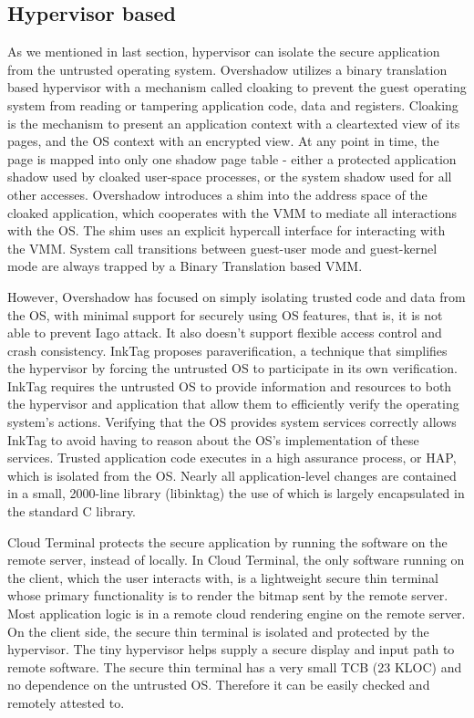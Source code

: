 \subsection{Hypervisor based}

As we mentioned in last section, hypervisor can isolate the secure application
from the untrusted operating system. Overshadow \cite{Overshadow} utilizes a
binary translation based hypervisor with a mechanism called cloaking to prevent
the guest operating system from reading or tampering application code, data and
registers.  Cloaking is the mechanism to present an application context with a
cleartexted view of its pages, and the OS context with an encrypted view. At
any point in time, the page is mapped into only one shadow page table - either
a protected application shadow used by cloaked user-space processes, or the
system shadow used for all other accesses. Overshadow introduces a shim into
the address space of the cloaked application, which cooperates with the VMM to
mediate all interactions with the OS. The shim uses an explicit hypercall
interface for interacting with the VMM. System call transitions between
guest-user mode and guest-kernel mode are always trapped by a Binary
Translation based VMM.

However, Overshadow has focused on simply isolating trusted code and data from
the OS, with minimal support for securely using OS features, that is, it is not
able to prevent Iago attack. It also doesn't support flexible access control
and crash consistency. InkTag proposes paraverification, a technique that
simplifies the hypervisor by forcing the untrusted OS to participate in its own
verification. InkTag requires the untrusted OS to provide information and
resources to both the hypervisor and application that allow them to efficiently
verify the operating system's actions. Verifying that the OS provides system
services correctly allows InkTag to avoid having to reason about the OS's
implementation of these services. Trusted application code executes in a high
assurance process, or HAP, which is isolated from the OS. Nearly all
application-level changes are contained in a small, 2000-line library
(libinktag) the use of which is largely encapsulated in the standard C library.

Cloud Terminal \cite{CloudTerminal} protects the secure application by running
the software on the remote server, instead of locally. In Cloud Terminal, the
only software running on the client, which the user interacts with, is a
lightweight secure thin terminal whose primary functionality is to render the
bitmap sent by the remote server. Most application logic is in a
remote cloud rendering engine on the remote server. On the client side, the
secure thin terminal is isolated and protected by the hypervisor. The tiny
hypervisor helps supply a secure display and input path to remote software. The
secure thin terminal has a very small TCB (23 KLOC) and no dependence on the
untrusted OS. Therefore it can be easily checked and remotely attested to.

